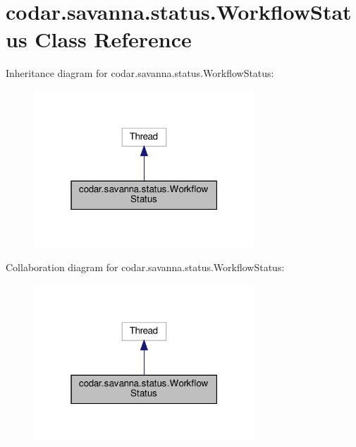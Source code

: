 \hypertarget{classcodar_1_1savanna_1_1status_1_1_workflow_status}{}\section{codar.\+savanna.\+status.\+Workflow\+Status Class Reference}
\label{classcodar_1_1savanna_1_1status_1_1_workflow_status}


Inheritance diagram for codar.\+savanna.\+status.\+Workflow\+Status\+:
\nopagebreak
\begin{figure}[H]
\begin{center}
\leavevmode
\includegraphics[width=235pt]{classcodar_1_1savanna_1_1status_1_1_workflow_status__inherit__graph}
\end{center}
\end{figure}


Collaboration diagram for codar.\+savanna.\+status.\+Workflow\+Status\+:
\nopagebreak
\begin{figure}[H]
\begin{center}
\leavevmode
\includegraphics[width=235pt]{classcodar_1_1savanna_1_1status_1_1_workflow_status__coll__graph}
\end{center}
\end{figure}
